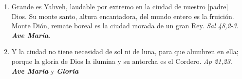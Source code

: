 \documentclass[../../devocionario.tex]{subfiles}
\begin{document}
\begin{enumerate}
        \item Grande es Yahveh, laudable por extremo en la ciudad de nuestro [padre] Dios. Su monte santo, altura encantadora, 
            del mundo entero  es la fruición. Monte Dión, remate boreal es la ciudad morada de un gran Rey. \textit{Sal 48,2-3}. \textbf{\textit{Ave María}}.

        \item Y la ciudad no tiene necesidad de sol ni de luna, para que alumbren en ella; 
            porque la gloria de Dios la ilumina y su antorcha es el Cordero. \textit{Ap 21,23}. \textbf{\textit{Ave María}} y \textbf{\textit{Gloria}}
    
    \end{enumerate}
\end{document}
